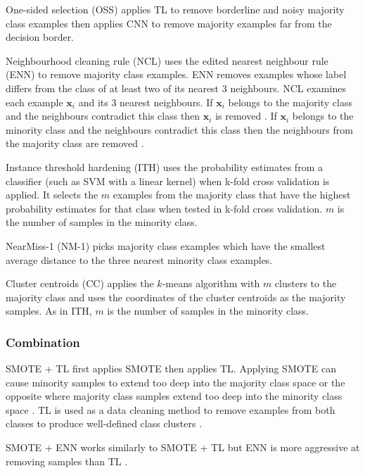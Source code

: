 \documentclass{sig-alternate-05-2015}
\begin{document}
	One-sided selection (OSS) \cite{Kubat97addressingthe} applies TL to remove borderline and noisy majority class examples then applies CNN to remove majority examples far from the decision border.
	
	Neighbourhood cleaning rule (NCL) \cite{Laurikkala:2001:IID:648155.757340} uses the edited nearest neighbour rule (ENN) to remove majority class examples. ENN removes examples whose label differs from the class of at least two of its nearest 3 neighbours. NCL examines each example $\textbf{x}_i$ and its 3 nearest neighbours. If $\textbf{x}_i$ belongs to the majority class and the neighbours contradict this class then $\textbf{x}_i$ is removed \cite{Batista:2004:SBS:1007730.1007735}. If $\textbf{x}_i$ belongs to the minority class and the neighbours contradict this class then the neighbours from the majority class are removed \cite{Batista:2004:SBS:1007730.1007735}.
	
	Instance threshold hardening (ITH) \cite{Smith:2014:ILA:2843614.2843686} uses the probability estimates from a classifier (such as SVM with a linear kernel) when k-fold cross validation is applied. It selects the $m$ examples from the majority class that have the highest probability estimates for that class when tested in k-fold cross validation. $m$ is the number of samples in the minority class.
	
	NearMiss-1 (NM-1) \cite{mani2003knn} picks majority class examples which have the smallest average distance to the three nearest minority class examples.
	
	Cluster centroids (CC) applies the $k$-means algorithm with $m$ clusters to the majority class and uses the coordinates of the cluster centroids as the majority samples. As in ITH, $m$ is the number of samples in the minority class.	
	
	\subsubsection{Combination}
	SMOTE + TL \cite{batista2003balancing} first applies SMOTE then applies TL. Applying SMOTE can cause minority samples to extend too deep into the majority class space or the opposite where majority class samples extend too deep into the minority class space \cite{batista2003balancing}. TL is used as a data cleaning method to remove examples from both classes to produce well-defined class clusters \cite{batista2003balancing}.
	
	SMOTE + ENN works similarly to SMOTE + TL but ENN is more aggressive at removing samples than TL \cite{Batista:2004:SBS:1007730.1007735}.
	
\end{document}
